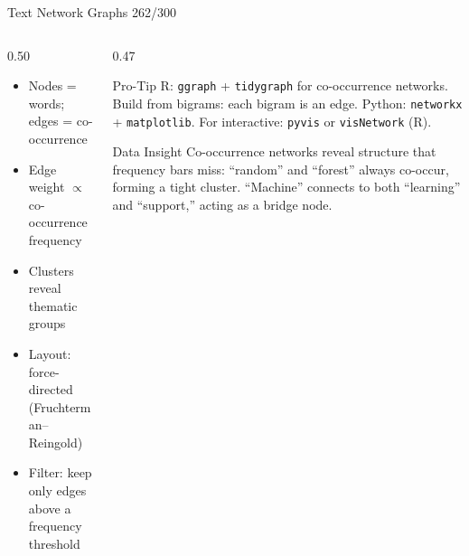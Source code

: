 \documentclass[10pt]{beamer}
\newcommand{\smark}[1]{\hfill{\scriptsize\color{codegray}#1}}
\begin{document}
\begin{frame}{Text Network Graphs}
\smark{262/300}
\begin{columns}[T]
\begin{column}{0.50\textwidth}
\begin{itemize}
    \item Nodes = words; edges = co-occurrence
    \item Edge weight $\propto$ co-occurrence frequency
    \item Clusters reveal thematic groups
    \item Layout: force-directed (Fruchterman--Reingold)
    \item Filter: keep only edges above a frequency threshold
\end{itemize}
\end{column}
\begin{column}{0.47\textwidth}
\begin{alertblock}{Pro-Tip}
    \scriptsize R: \texttt{ggraph} + \texttt{tidygraph} for co-occurrence networks. Build from bigrams: each bigram is an edge. Python: \texttt{networkx} + \texttt{matplotlib}. For interactive: \texttt{pyvis} or \texttt{visNetwork} (R).
\end{alertblock}
\vspace{0.1cm}
\begin{exampleblock}{Data Insight}
    \scriptsize Co-occurrence networks reveal structure that frequency bars miss: ``random'' and ``forest'' always co-occur, forming a tight cluster. ``Machine'' connects to both ``learning'' and ``support,'' acting as a bridge node.
\end{exampleblock}
\end{column}
\end{columns}
\end{frame}
\end{document}
